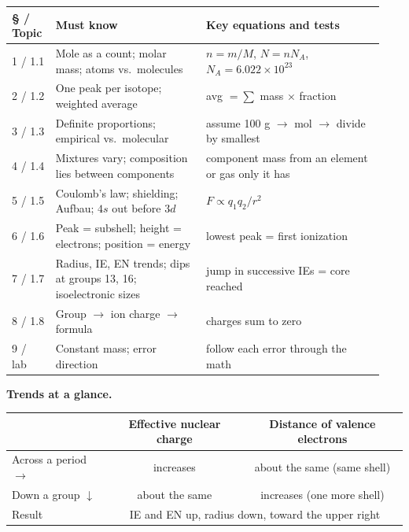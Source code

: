 \documentclass[11pt]{article}
\begin{document}
\begin{longtable}{@{}p{0.11\linewidth}p{0.38\linewidth}p{0.45\linewidth}@{}}\toprule
\S{} / Topic & Must know & Key equations and tests \\ \midrule
1 / 1.1 & Mole as a count; molar mass; atoms vs.\ molecules & $n = m/M$, $N = nN_A$, $N_A = 6.022\times10^{23}$ \\[3pt]
2 / 1.2 & One peak per isotope; weighted average & avg $= \sum$ mass $\times$ fraction \\[3pt]
3 / 1.3 & Definite proportions; empirical vs.\ molecular & assume 100 g $\rightarrow$ mol $\rightarrow$ divide by smallest \\[3pt]
4 / 1.4 & Mixtures vary; composition lies between components & component mass from an element or gas only it has \\[3pt]
5 / 1.5 & Coulomb's law; shielding; Aufbau; $4s$ out before $3d$ & $F \propto q_1q_2/r^2$ \\[3pt]
6 / 1.6 & Peak = subshell; height = electrons; position = energy & lowest peak = first ionization \\[3pt]
7 / 1.7 & Radius, IE, EN trends; dips at groups 13, 16; isoelectronic sizes & jump in successive IEs = core reached \\[3pt]
8 / 1.8 & Group $\rightarrow$ ion charge $\rightarrow$ formula & charges sum to zero \\[3pt]
9 / lab & Constant mass; error direction & follow each error through the math \\ \bottomrule
\end{longtable}

\textbf{Trends at a glance.}
\begin{center}
\begin{tabular}{lcc}\toprule
& Effective nuclear charge & Distance of valence electrons \\ \midrule
Across a period $\rightarrow$ & increases & about the same (same shell) \\
Down a group $\downarrow$ & about the same & increases (one more shell) \\ \midrule
Result & \multicolumn{2}{c}{IE and EN up, radius down, toward the upper right} \\ \bottomrule
\end{tabular}
\end{center}
\end{document}
